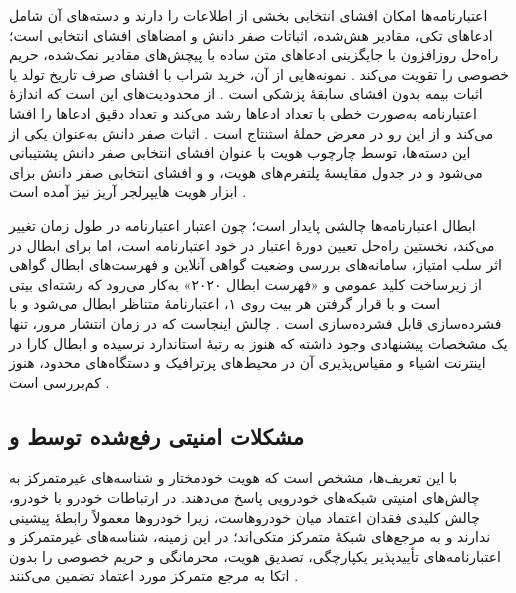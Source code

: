 \documentclass[12pt,a4paper]{article}
\begin{document}
اعتبارنامه‌ها امکان افشای انتخابی بخشی از اطلاعات را دارند و دسته‌های آن شامل ادعا‌های تکی، مقادیر هش‌شده، اثباتات صفر دانش و امضا‌های افشای انتخابی است؛ راه‌حل روزافزون  با جایگزینی ادعا‌های متن ساده با پیچش‌های مقادیر نمک‌شده، حریم خصوصی را تقویت می‌کند \cite{mazzocca2025survey}. نمونه‌هایی از آن، خرید شراب با افشای صرف تاریخ تولد یا اثبات بیمه بدون افشای سابقهٔ پزشکی است \cite{mazzocca2025survey}. از محدودیت‌های  این است که اندازهٔ اعتبارنامه به‌صورت خطی با تعداد ادعا‌ها رشد می‌کند و تعداد دقیق ادعا‌ها را افشا می‌کند و از این رو در معرض حملهٔ استنتاج است \cite{mazzocca2025survey}. اثبات صفر دانش  به‌عنوان یکی از این دسته‌ها، توسط چارچوب هویت  با عنوان افشای انتخابی صفر دانش پشتیبانی می‌شود و در جدول مقایسهٔ پلتفرم‌های هویت،  و  و افشای انتخابی صفر دانش برای ابزار هویت هایپرلجر آریز نیز آمده است \cite{mazzocca2025survey}.

ابطال اعتبارنامه‌ها چالشی پایدار است؛ چون اعتبار اعتبارنامه در طول زمان تغییر می‌کند، نخستین راه‌حل تعیین دورهٔ اعتبار در خود اعتبارنامه است، اما برای ابطال در اثر سلب امتیاز، سامانه‌های بررسی وضعیت گواهی آنلاین و فهرست‌های ابطال گواهی از زیرساخت کلید عمومی و «فهرست ابطال ۲۰۲۰»  به‌کار می‌رود که رشته‌ای بیتی است و با قرار گرفتن هر بیت روی ۱، اعتبارنامهٔ متناظر ابطال می‌شود و با فشرده‌سازی  قابل فشرده‌سازی است \cite{mazzocca2025survey}. چالش اینجاست که در زمان انتشار مرور، تنها یک مشخصات پیشنهادی وجود داشته که هنوز به رتبهٔ استاندارد  نرسیده و ابطال کارا در اینترنت اشیاء و مقیاس‌پذیری آن در محیط‌های پرترافیک و دستگاه‌های محدود، هنوز کم‌بررسی است \cite{mazzocca2025survey}.

\subsection{مشکلات امنیتی رفع‌شده توسط  و }

با این تعریف‌ها، مشخص است که هویت خودمختار و شناسه‌های غیرمتمرکز به چالش‌های امنیتی شبکه‌های خودرویی پاسخ می‌دهند. در ارتباطات خودرو با خودرو، چالش کلیدی فقدان اعتماد میان خودروهاست، زیرا خودرو‌ها معمولاً رابطهٔ پیشینی ندارند و به مرجع‌های شبکهٔ متمرکز متکی‌اند؛ در این زمینه، شناسه‌های غیرمتمرکز و اعتبارنامه‌های تأییدپذیر یکپارچگی، تصدیق هویت، محرمانگی و حریم خصوصی را بدون اتکا به مرجع متمرکز مورد اعتماد تضمین می‌کنند \cite{mazzocca2025survey}.
\end{document}
